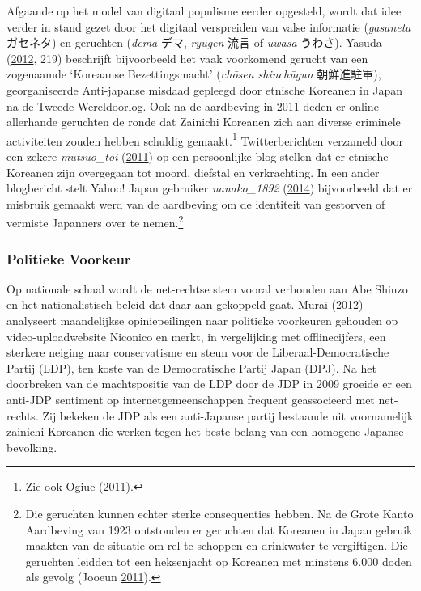 \documentclass[10.5pt,dutch,]{article}
\begin{document}
Afgaande op het model van digitaal populisme eerder opgesteld, wordt dat
idee verder in stand gezet door het digitaal verspreiden van valse
informatie (\emph{gasaneta} ガセネタ) en geruchten (\emph{dema} デマ,
\emph{ryūgen} 流言 of \emph{uwasa} うわさ). Yasuda
(\protect\hyperlink{ref-yasudaux5fnettoux5f2012}{2012}, 219) beschrijft
bijvoorbeeld het vaak voorkomend gerucht van een zogenaamde `Koreaanse
Bezettingsmacht' (\emph{chōsen shinchūgun} 朝鮮進駐軍), georganiseerde
Anti-japanse misdaad gepleegd door etnische Koreanen in Japan na de
Tweede Wereldoorlog. Ook na de aardbeving in 2011 deden er online
allerhande geruchten de ronde dat Zainichi Koreanen zich aan diverse
criminele activiteiten zouden hebben schuldig gemaakt.\footnote{Zie ook
  Ogiue (\protect\hyperlink{ref-ogiueux5fkenshoux5f2011}{2011}).}
Twitterberichten verzameld door een zekere \emph{mutsuo\_toi}
(\protect\hyperlink{ref-mutsuoux5ftoiux5fhigashinihonux5f2011}{2011}) op
een persoonlijke blog stellen dat er etnische Koreanen zijn overgegaan
tot moord, diefstal en verkrachting. In een ander blogbericht stelt
Yahoo! Japan gebruiker \emph{nanako\_1892}
(\protect\hyperlink{ref-nanakoux5f1892ux5fzainichikankokujinux5f2014}{2014})
bijvoorbeeld dat er misbruik gemaakt werd van de aardbeving om de
identiteit van gestorven of vermiste Japanners over te nemen.\footnote{Die
  geruchten kunnen echter sterke consequenties hebben. Na de Grote Kanto
  Aardbeving van 1923 ontstonden er geruchten dat Koreanen in Japan
  gebruik maakten van de situatie om rel te schoppen en drinkwater te
  vergiftigen. Die geruchten leidden tot een heksenjacht op Koreanen met
  minstens 6.000 doden als gevolg (Jooeun
  \protect\hyperlink{ref-jooeunux5fgreatux5f2011}{2011}).}

\subsubsection{Politieke Voorkeur}\label{politieke-voorkeur}

Op nationale schaal wordt de net-rechtse stem vooral verbonden aan Abe
Shinzo en het nationalistisch beleid dat daar aan gekoppeld gaat. Murai
(\protect\hyperlink{ref-muraiux5fnetux5f2012}{2012}) analyseert
maandelijkse opiniepeilingen naar politieke voorkeuren gehouden op
video-uploadwebsite Niconico en merkt, in vergelijking met
offlinecijfers, een sterkere neiging naar conservatisme en steun voor de
Liberaal-Democratische Partij (LDP), ten koste van de Democratische
Partij Japan (DPJ). Na het doorbreken van de machtspositie van de LDP
door de JDP in 2009 groeide er een anti-JDP sentiment op
internetgemeenschappen frequent geassocieerd met net-rechts. Zij bekeken
de JDP als een anti-Japanse partij bestaande uit
voornamelijk zainichi Koreanen die werken tegen het beste belang van een
homogene Japanse bevolking.
\end{document}

